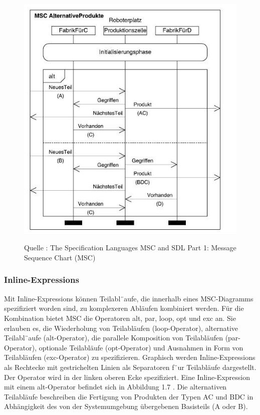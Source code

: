 \begin{center}
\begin{figure}[h]
   

\includegraphics[scale=1]{Graphics/MSCmit.jpg}



Quelle : The Specification Languages MSC and SDL
Part 1: Message Sequence Chart (MSC) 

 
\label{fig8}


\end{figure}

\end{center}
\newpage
\subsubsection{Inline-Expressions}
Mit Inline-Expressions können Teilabl¨aufe, die innerhalb
eines MSC-Diagramms spezifiziert worden sind, zu komplexeren
Abläufen kombiniert werden. Für die Kombination
bietet MSC die Operatoren alt, par, loop, opt und exc an. Sie erlauben es, die Wiederholung von Teilabläufen
(loop-Operator), alternative Teilabl¨aufe (alt-Operator), die
parallele Komposition von Teilabläufen (par-Operator), optionale
Teilabläufe (opt-Operator) und Ausnahmen in Form
von Teilabläufen (exc-Operator) zu spezifizieren. Graphisch
werden Inline-Expressions als Rechtecke mit gestrichelten
Linien als Separatoren f¨ur Teilabläufe dargestellt. Der Operator
wird in der linken oberen Ecke spezifiziert.
Eine Inline-Expression mit einem alt-Operator befindet
sich in Abbildung 1.7 . Die alternativen Teilabläufe beschreiben
die Fertigung von Produkten der Typen AC und BDC in
Abhängigkeit des von der Systemumgebung übergebenen
Basisteils (A oder B).\\
